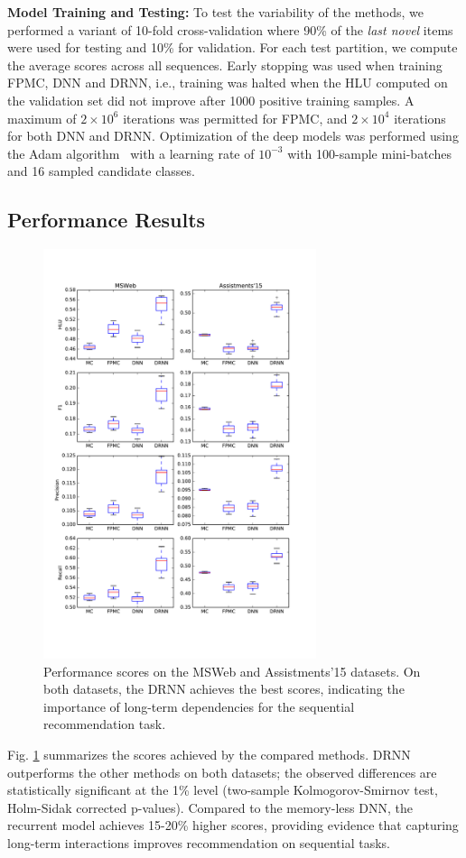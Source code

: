 \documentclass{sig-alternate-05-2015}
\begin{document}
\vspace{2mm}
\noindent\textbf{Model Training and Testing:} To test the variability of the methods, we performed a variant of 10-fold cross-validation where 90\% of the \emph{last novel} items were used for testing and 10\% for validation. For each test partition, we compute the average scores across all sequences. Early stopping was used when training FPMC, DNN and DRNN, i.e., training was halted when the HLU computed on the validation set did not improve after 1000 positive training samples. A maximum of $2\times 10^6$ iterations was permitted for FPMC, and $2\times 10^4$ iterations for both DNN and DRNN. Optimization of the deep models was performed using the Adam algorithm~\cite{Kingma2015} with a learning rate of $10^{-3}$ with 100-sample mini-batches and 16 sampled candidate classes.

\subsection{Performance Results}
\begin{figure}
\includegraphics[width=8cm]{images/PerfBoxplots}		
\caption{Performance scores on the MSWeb and Assistments'15 datasets. On both datasets, the DRNN achieves the best scores, indicating the importance of long-term dependencies for the sequential recommendation task.}
\label{fig:PerfResults}
\end{figure}
Fig. \ref{fig:PerfResults} summarizes the scores achieved by the compared methods. DRNN outperforms the other methods on both datasets; the observed differences are statistically significant at the 1\% level (two-sample Kolmogorov-Smirnov test, Holm-Sidak corrected p-values). Compared to the memory-less DNN, the recurrent model achieves 15-20\% higher scores, providing evidence that capturing long-term interactions improves recommendation on sequential tasks. 
\end{document}
